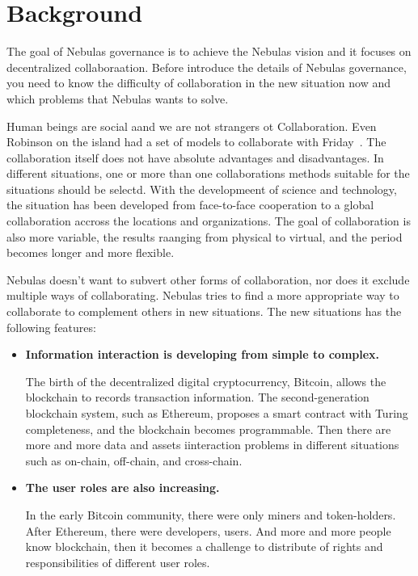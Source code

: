 \section{Background}

The goal of Nebulas governance is to achieve the Nebulas vision and it focuses on decentralized collaboraation. Before introduce the details of Nebulas governance, you need to know the difficulty of collaboration in the new situation now and which problems that Nebulas wants to solve.

\label{background}

Human beings are social aand we are not strangers ot Collaboration. Even Robinson on the island had a set of models to collaborate with Friday~\cite{robinson}. The collaboration itself does not have absolute advantages and disadvantages. In different situations, one or more than one collaborations methods suitable for the situations should be selectd. With the developmeent of science and technology, the situation has been developed from face-to-face cooperation to a global collaboration accross the locations and organizations. The goal of collaboration is also more variable, the results raanging from physical to virtual, and the period becomes longer and more flexible.

Nebulas doesn't want to subvert other forms of collaboration, nor does it exclude multiple ways of collaborating. Nebulas tries to find a more appropriate way to collaborate to complement others in new situations. The new situations has the following features:

\begin{itemize}
	\item \textbf{Information interaction is developing from simple to complex.}

	The birth of the decentralized digital cryptocurrency, Bitcoin, allows the blockchain to records transaction information. The second-generation blockchain system, such as Ethereum, proposes a smart contract with Turing completeness, and the blockchain becomes programmable. Then there are more and more data and assets iinteraction problems in different situations such as on-chain, off-chain, and cross-chain.

	\item \textbf{The user roles are also increasing.}

	In the early Bitcoin community, there were only miners and token-holders. After Ethereum, there were developers, users. And more and more people know blockchain, then it becomes a challenge to distribute of rights and responsibilities of different user roles.

\end{itemize}

